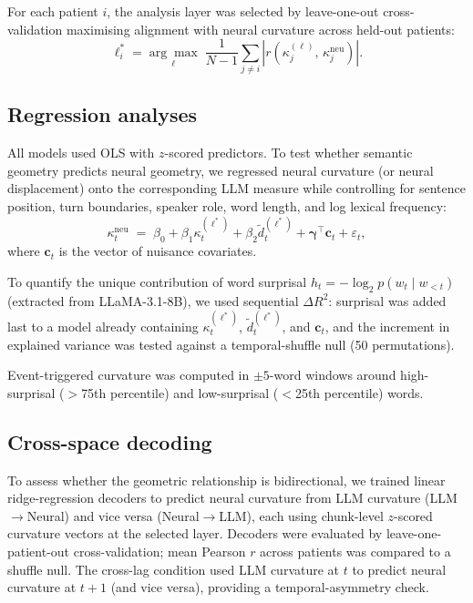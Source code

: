 For each patient $i$, the analysis layer was selected by leave-one-out
cross-validation maximising alignment with neural curvature across held-out
patients:
\begin{equation}
  \ell^*_i = \underset{\ell}{\arg\max}\;
    \frac{1}{N-1}\sum_{j\neq i}
    \left|r\!\left(\kappa^{(\ell)}_j,\,\kappa^{\mathrm{neu}}_j\right)\right|.
  \label{eq:loo}
\end{equation}

\subsection*{Regression analyses}

All models used OLS with $z$-scored predictors.
To test whether semantic geometry predicts neural geometry, we regressed
neural curvature (or neural displacement) onto the corresponding LLM measure
while controlling for sentence position, turn boundaries, speaker role, word
length, and log lexical frequency:
\begin{equation}
  \kappa^{\mathrm{neu}}_t \;=\;
    \beta_0 + \beta_1\kappa^{(\ell^*)}_t + \beta_2\tilde{d}^{(\ell^*)}_t
    + \boldsymbol{\gamma}^{\!\top}\mathbf{c}_t + \varepsilon_t,
  \label{eq:reg_neural}
\end{equation}
where $\mathbf{c}_t$ is the vector of nuisance covariates.

To quantify the unique contribution of word surprisal
$h_t = -\log_2 p(w_t\mid w_{<t})$ (extracted from LLaMA-3.1-8B),
we used sequential $\Delta R^2$: surprisal was added last to a model already
containing $\kappa^{(\ell^*)}_t$, $\tilde{d}^{(\ell^*)}_t$, and
$\mathbf{c}_t$, and the increment in explained variance was tested against a
temporal-shuffle null (50 permutations).

Event-triggered curvature was computed in $\pm5$-word windows around
high-surprisal ($>\!$75th percentile) and low-surprisal ($<\!$25th percentile)
words.

\subsection*{Cross-space decoding}

To assess whether the geometric relationship is bidirectional, we trained
linear ridge-regression decoders to predict neural curvature from LLM curvature
(LLM$\to$Neural) and vice versa (Neural$\to$LLM), each using chunk-level
$z$-scored curvature vectors at the selected layer.
Decoders were evaluated by leave-one-patient-out cross-validation; mean
Pearson $r$ across patients was compared to a shuffle null.
The cross-lag condition used LLM curvature at $t$ to predict neural curvature
at $t+1$ (and vice versa), providing a temporal-asymmetry check.
